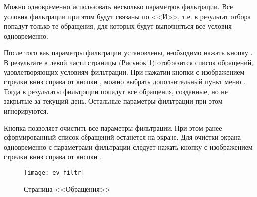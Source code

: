 Можно одновременно использовать несколько параметров фильтрации. Все условия фильтрации при этом будут связаны по <<И>>, т.е. в результат отбора попадут только те обращения, для которых будут выполняться все условия одновременно.

После того как параметры фильтрации установлены, необходимо нажать кнопку . В результате в левой части страницы (Рисунок \ref{img_ev_filtr}) отобразится список обращений, удовлетворяющих условиям фильтрации. При нажатии кнопки с изображением стрелки вниз справа от кнопки , можно выбрать дополнительный пункт меню . Тогда в результаты фильтрации попадут все обращения, созданные, но не закрытые за текущий день. Остальные параметры фильтрации при этом игнорируются.

Кнопка  позволяет очистить все параметры фильтрации. При этом ранее сформированный список обращений останется на экране. Для очистки экрана одновременно с параметрами фильтрации следует нажать кнопку с изображением стрелки вниз справа от кнопки .


\begin{figure}[ht]\centering
   \texttt{[image: ev\_filtr]}
   \caption{Страница <<Обращения>>}
   \label{img_ev_filtr}
 \end{figure}
